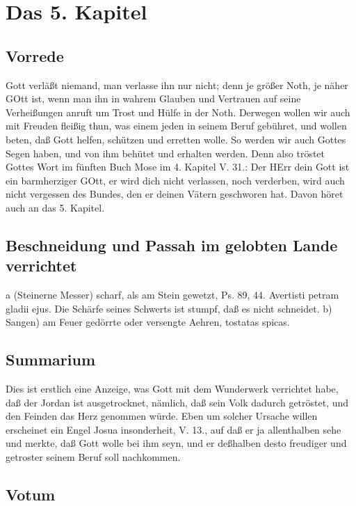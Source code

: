 \chapter{Das 5. Kapitel}

\section{Vorrede}

Gott verläßt niemand, man verlasse ihn nur nicht; denn je größer Noth, je näher GOtt ist, wenn man ihn in wahrem Glauben und Vertrauen auf seine Verheißungen anruft um Trost und Hülfe in der Noth. Derwegen wollen wir auch mit Freuden fleißig thun, was einem jeden in seinem Beruf gebühret, und wollen beten, daß Gott helfen, schützen und erretten wolle. So werden wir auch Gottes Segen haben, und von ihm behütet und erhalten werden. Denn also tröstet Gottes Wort im fünften Buch Mose im 4. Kapitel V. 31.: Der HErr dein Gott ist ein barmherziger GOtt, er wird dich nicht verlassen, noch verderben, wird auch nicht vergessen des Bundes, den er deinen Vätern geschworen hat. Davon höret auch an das 5. Kapitel.

\section{Beschneidung und Passah im gelobten Lande verrichtet}

a (Steinerne Messer) scharf, als am Stein gewetzt, Ps. 89, 44. Avertisti petram gladii ejus. Die Schärfe seines Schwerts ist stumpf, daß es nicht schneidet.
b) Sangen) am Feuer gedörrte oder versengte Aehren, tostatas spicas.

\section{Summarium}

Dies ist erstlich eine Anzeige, was Gott mit dem Wunderwerk verrichtet habe, daß der Jordan ist ausgetrocknet, nämlich, daß sein Volk dadurch getröstet, und den Feinden das Herz genommen würde. Eben um solcher Ursache willen erscheinet ein Engel Josua insonderheit, V. 13., auf daß er ja allenthalben sehe und merkte, daß Gott wolle bei ihm seyn, und er deßhalben desto freudiger und getroster seinem Beruf soll nachkommen.

\section{Votum}

